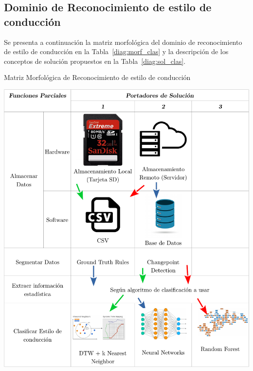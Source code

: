 \subsection{Dominio de Reconocimiento de estilo de conducción}
Se presenta a continuación la matriz morfológica del dominio de reconocimiento de estilo de conducción en la Tabla~\ref{diag:morf_clas} y la descripción de los conceptos de solución propuestos en la Tabla~\ref{diag:sol_clas}.
\begin{table}[htbp!]
  \caption{Matriz Morfológica de Reconocimiento de estilo de conducción}
  \label{diag:morf_clas}
  \centering
  \includegraphics[width=\linewidth]{morf_clas.pdf}
\end{table}
\

